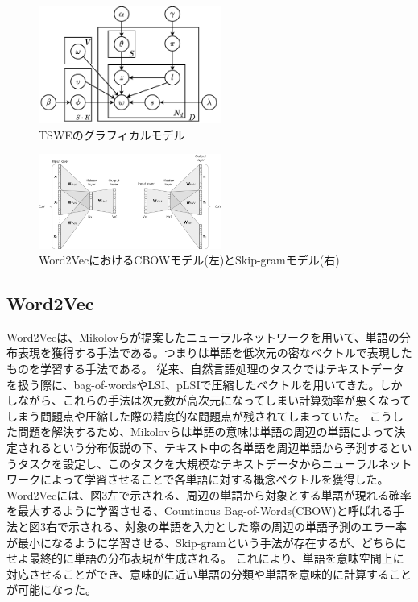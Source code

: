 \documentclass[uplatex]{jsarticle}
\begin{document}
\begin{figure}[thp]
    \begin{center}
        \includegraphics[width=6cm]{picture/TSWE.png}
    \end{center}
    \caption{TSWEのグラフィカルモデル}
\end{figure}
\begin{figure}[tbp]
    \begin{center}
        \includegraphics[width=6cm]{picture/Word2Vec.png}
    \end{center}
    \caption{Word2VecにおけるCBOWモデル(左)とSkip-gramモデル(右)\protect\footnotemark[1]}
\end{figure}


\subsection{Word2Vec}
Word2Vecは、Mikolovら\cite{Word2Vec}が提案したニューラルネットワークを用いて、単語の分布表現を獲得する手法である。つまりは単語を低次元の密なベクトルで表現したものを学習する手法である。
従来、自然言語処理のタスクではテキストデータを扱う際に、bag-of-wordsやLSI\cite{LSI}、pLSI\cite{pLSI}で圧縮したベクトルを用いてきた。しかしながら、これらの手法は次元数が高次元になってしまい計算効率が悪くなってしまう問題点や圧縮した際の精度的な問題点が残されてしまっていた。
こうした問題を解決するため、Mikolovらは単語の意味は単語の周辺の単語によって決定されるという分布仮説の下、テキスト中の各単語を周辺単語から予測するというタスクを設定し、このタスクを大規模なテキストデータからニューラルネットワークによって学習させることで各単語に対する概念ベクトルを獲得した。
Word2Vecには、図3左で示される、周辺の単語から対象とする単語が現れる確率を最大するように学習させる、Countinous Bag-of-Words(CBOW)と呼ばれる手法と図3右で示される、対象の単語を入力とした際の周辺の単語予測のエラー率が最小になるように学習させる、Skip-gramという手法が存在するが、どちらにせよ最終的に単語の分布表現が生成される。
これにより、単語を意味空間上に対応させることができ、意味的に近い単語の分類や単語を意味的に計算することが可能になった。
\end{document}

